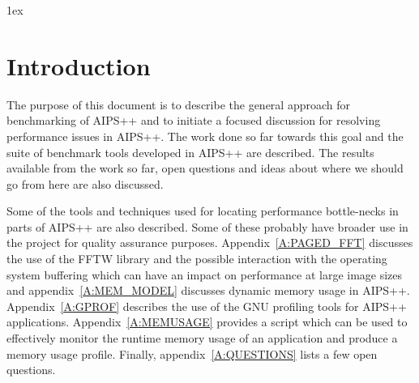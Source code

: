 

\parskip 1ex    %

%


\section{Introduction}

The purpose of this document is to describe the general approach for
benchmarking of AIPS++ and to initiate a focused discussion for
resolving performance issues in AIPS++.  The work done so far towards
this goal and the suite of benchmark tools developed in AIPS++ are
described.  The results available from the work so far, open questions
and ideas about where we should go from here are also discussed.

Some of the tools and techniques used for locating performance
bottle-necks in parts of AIPS++ are also described.  Some of these
probably have broader use in the project for quality assurance
purposes.  Appendix~\ref{A:PAGED_FFT} discusses the use of the FFTW
library and the possible interaction with the operating system
buffering which can have an impact on performance at large image sizes
and appendix~\ref{A:MEM_MODEL} discusses dynamic memory usage in
AIPS++.  Appendix~\ref{A:GPROF} describes the use of the GNU profiling
tools for AIPS++ applications.  Appendix~\ref{A:MEMUSAGE} provides a
script which can be used to effectively monitor the runtime memory
usage of an application and produce a memory usage profile.  Finally,
appendix~\ref{A:QUESTIONS} lists a few open questions.

